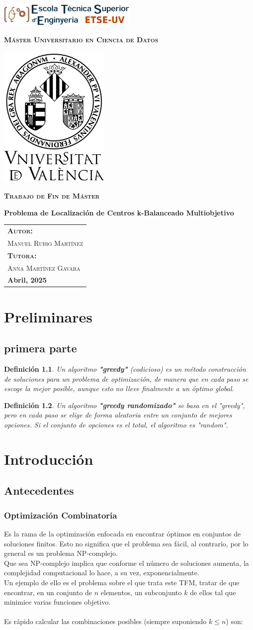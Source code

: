 \documentclass[12pt,a4paper]{book}
\newtheorem{defi}{Definición}[section]
\newcommand{\nuevaportada}[6]{
    \thispagestyle{empty}
    \begin{center}
        \includegraphics[width=0.5\textwidth]{images/logo.png}
        
        \vspace{0.3cm} %
        {\Large\bfseries\textsc{M\'aster Universitario en #1}\par}
        
        \vspace{0.3cm} %
        \includegraphics[width=0.4\textwidth]{images/uv.png}
        
        \vspace{0.3cm} %
        {\Large\bfseries\textsc{Trabajo de Fin de M\'aster}\par}
        
        \vspace{0.5cm} %
        {\Large\bfseries #2\par}
        
        \vspace{1.5cm} %
        \begin{flushright}
            \begin{tabular}{l} 
                {\large\bfseries\textsc{Autor:}} \\
                {\large\textsc{#3}} \\ [0.3cm] %
                {\large\bfseries\textsc{Tutora:}} \\ 
                {\large\textsc{#4}} \\ [0.3cm] %
                {\large\bfseries #5} 
            \end{tabular}
        \end{flushright}
    \end{center}
}
\begin{document}
\nuevaportada{Ciencia de Datos}{Problema de Localización de Centros k-Balanceado Multiobjetivo}{Manuel Rubio Martínez}{Anna Martínez Gavara}{Abril, 2025}

\clearpage

\newpage
\tableofcontents

\chapter{Preliminares}
\section{primera parte}

\begin{defi}
Un algoritmo \textbf{"greedy"} (codicioso) es un método construcción de soluciones para un problema de optimización,
de manera que en cada paso se escoge la mejor posible, aunque esto no lleve finalmente a un óptimo global.
\end{defi}

\bigskip

\begin{defi}
Un algoritmo \textbf{"greedy randomizado"} se basa en el "greedy", pero en cada paso se elige de forma aleatoria entre un conjunto de mejores opciones.
Si el conjunto de opciones es el total, el algoritmo es "random".
\end{defi}

\chapter{Introducción}

\section{Antecedentes}
\subsection{Optimización Combinatoria}

Es la rama de la optimización enfocada en encontrar óptimos en conjuntos de soluciones finitos.
Esto no significa que el problema sea fácil, al contrario, por lo general es un problema NP-complejo. \\
Que sea NP-complejo implica que conforme el número de soluciones aumenta, la complejidad computacional lo hace, a su vez, exponencialmente. \\
Un ejemplo de ello es el problema sobre el que trata este TFM, 
tratar de que encontrar, en un conjunto de $n$ elementos, un subconjunto $k$ de ellos tal que  minimice varias funciones objetivo.
\\ \\
Es rápido calcular las combinaciones posibles (siempre suponiendo $k \leq  n$) son:
\end{document}
